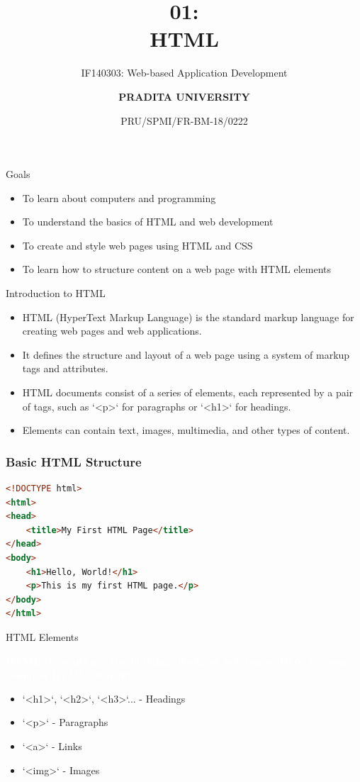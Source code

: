 \documentclass[aspectratio=169, table]{beamer}
\subtitle{IF140303: Web-based Application Development}
\title{\Huge {\textbf{01: \\HTML}}}
\date[Serial]{\scriptsize {PRU/SPMI/FR-BM-18/0222}}
\author[Pradita]{\small {\textbf{PRADITA UNIVERSITY}}}
\begin{document}
\begin{frame}
		\titlepage
	\end{frame}
	
	\begin{frame}{Goals}
		\vskip-1cm
		\begin{itemize}
			\item To learn about computers and programming
			\item To understand the basics of HTML and web development
			\item To create and style web pages using HTML and CSS
			\item To learn how to structure content on a web page with HTML elements
		\end{itemize}
	\end{frame}

	\begin{frame}{Introduction to HTML}
		\vskip-0.5cm
		\begin{itemize}
			\item HTML (HyperText Markup Language) is the standard markup language for creating web pages and web applications.
			\item It defines the structure and layout of a web page using a system of markup tags and attributes.
			\item HTML documents consist of a series of elements, each represented by a pair of tags, such as `<p>` for paragraphs or `<h1>` for headings.
			\item Elements can contain text, images, multimedia, and other types of content.
		\end{itemize}
	\end{frame}

	\begin{frame}[fragile] %
		\frametitle{Basic HTML Structure}
		\vskip0.5cm
		\begin{lstlisting}[language=HTML]
<!DOCTYPE html>
<html>
<head>
    <title>My First HTML Page</title>
</head>
<body>
    <h1>Hello, World!</h1>
    <p>This is my first HTML page.</p>
</body>
</html>
		\end{lstlisting}
	\end{frame}

	\begin{frame}{HTML Elements}
		\begin{tcolorbox}[standard jigsaw, opacityback=0, opacityframe=0, sharp corners, boxrule=0pt]
					\textbf{\textcolor{white}{HTML elements are the building blocks of web pages. Here are some common HTML elements:}}
					\begin{itemize}
						\item `<h1>`, `<h2>`, `<h3>`... - Headings
						\item `<p>` - Paragraphs
						\item `<a>` - Links
						\item `<img>` - Images
					\end{itemize}
		\end{tcolorbox}
	\end{frame}
\end{document}
